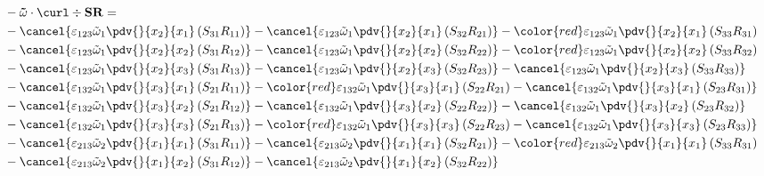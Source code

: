 \begin{equation}
	\begin{split}
&-\mathbf{\tilde{\omega}}\cdot\curl \div \mathbf{SR} = \\&		-\cancel{\varepsilon_{123}\tilde{\omega}_{1}\pdv{}{x_{2}}{x_{1}}\left(S_{31}R_{11}\right)}
		-\cancel{\varepsilon_{123}\tilde{\omega}_{1}\pdv{}{x_{2}}{x_{1}}\left(S_{32}R_{21}\right)}
		-{\color{red}\varepsilon_{123}\tilde{\omega}_{1}\pdv{}{x_{2}}{x_{1}}\left(S_{33}R_{31}\right)}\\
&		-\cancel{\varepsilon_{123}\tilde{\omega}_{1}\pdv{}{x_{2}}{x_{2}}\left(S_{31}R_{12}\right)}
		-\cancel{\varepsilon_{123}\tilde{\omega}_{1}\pdv{}{x_{2}}{x_{2}}\left(S_{32}R_{22}\right)}
		-{\color{red}\varepsilon_{123}\tilde{\omega}_{1}\pdv{}{x_{2}}{x_{2}}\left(S_{33}R_{32}\right)}\\
&		-\cancel{\varepsilon_{123}\tilde{\omega}_{1}\pdv{}{x_{2}}{x_{3}}\left(S_{31}R_{13}\right)}
		-\cancel{\varepsilon_{123}\tilde{\omega}_{1}\pdv{}{x_{2}}{x_{3}}\left(S_{32}R_{23}\right)}
		-\cancel{\varepsilon_{123}\tilde{\omega}_{1}\pdv{}{x_{2}}{x_{3}}\left(S_{33}R_{33}\right)}\\
&		-\cancel{\varepsilon_{132}\tilde{\omega}_{1}\pdv{}{x_{3}}{x_{1}}\left(S_{21}R_{11}\right)}
		-{\color{red}\varepsilon_{132}\tilde{\omega}_{1}\pdv{}{x_{3}}{x_{1}}\left(S_{22}R_{21}\right)}
		-\cancel{\varepsilon_{132}\tilde{\omega}_{1}\pdv{}{x_{3}}{x_{1}}\left(S_{23}R_{31}\right)}\\
&		-\cancel{\varepsilon_{132}\tilde{\omega}_{1}\pdv{}{x_{3}}{x_{2}}\left(S_{21}R_{12}\right)}
		-\cancel{\varepsilon_{132}\tilde{\omega}_{1}\pdv{}{x_{3}}{x_{2}}\left(S_{22}R_{22}\right)}
		-\cancel{\varepsilon_{132}\tilde{\omega}_{1}\pdv{}{x_{3}}{x_{2}}\left(S_{23}R_{32}\right)}\\
&		-\cancel{\varepsilon_{132}\tilde{\omega}_{1}\pdv{}{x_{3}}{x_{3}}\left(S_{21}R_{13}\right)}
		-{\color{red}\varepsilon_{132}\tilde{\omega}_{1}\pdv{}{x_{3}}{x_{3}}\left(S_{22}R_{23}\right)}
		-\cancel{\varepsilon_{132}\tilde{\omega}_{1}\pdv{}{x_{3}}{x_{3}}\left(S_{23}R_{33}\right)}\\
&		-\cancel{\varepsilon_{213}\tilde{\omega}_{2}\pdv{}{x_{1}}{x_{1}}\left(S_{31}R_{11}\right)}
		-\cancel{\varepsilon_{213}\tilde{\omega}_{2}\pdv{}{x_{1}}{x_{1}}\left(S_{32}R_{21}\right)}
		-{\color{red}\varepsilon_{213}\tilde{\omega}_{2}\pdv{}{x_{1}}{x_{1}}\left(S_{33}R_{31}\right)}\\
&		-\cancel{\varepsilon_{213}\tilde{\omega}_{2}\pdv{}{x_{1}}{x_{2}}\left(S_{31}R_{12}\right)}
		-\cancel{\varepsilon_{213}\tilde{\omega}_{2}\pdv{}{x_{1}}{x_{2}}\left(S_{32}R_{22}\right)}

\end{split}
\end{equation}
